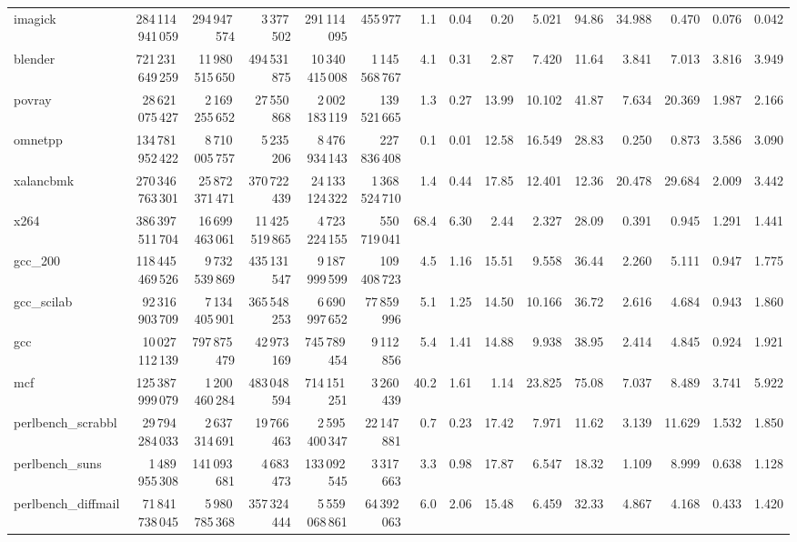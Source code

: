 \documentclass[9pt,landscape,a4paper]{article}
\begin{document}
\begin{adjustbox}{max width=\textwidth, max totalheight=0.50\textheight}
\begin{tabular}{lrrrrrrrrrrrrrr}
imagick & 284\,114\,941\,059 & 294\,947\,574 & 3\,377\,502 & 291\,114\,095 & 455\,977 & 1.1 & 0.04 & 0.20 & 5.021 & 94.86 & 34.988 & 0.470 & 0.076 & 0.042 \\
blender & 721\,231\,649\,259 & 11\,980\,515\,650 & 494\,531\,875 & 10\,340\,415\,008 & 1\,145\,568\,767 & 4.1 & 0.31 & 2.87 & 7.420 & 11.64 & 3.841 & 7.013 & 3.816 & 3.949 \\
povray & 28\,621\,075\,427 & 2\,169\,255\,652 & 27\,550\,868 & 2\,002\,183\,119 & 139\,521\,665 & 1.3 & 0.27 & 13.99 & 10.102 & 41.87 & 7.634 & 20.369 & 1.987 & 2.166 \\
omnetpp & 134\,781\,952\,422 & 8\,710\,005\,757 & 5\,235\,206 & 8\,476\,934\,143 & 227\,836\,408 & 0.1 & 0.01 & 12.58 & 16.549 & 28.83 & 0.250 & 0.873 & 3.586 & 3.090 \\
xalancbmk & 270\,346\,763\,301 & 25\,872\,371\,471 & 370\,722\,439 & 24\,133\,124\,322 & 1\,368\,524\,710 & 1.4 & 0.44 & 17.85 & 12.401 & 12.36 & 20.478 & 29.684 & 2.009 & 3.442 \\
x264 & 386\,397\,511\,704 & 16\,699\,463\,061 & 11\,425\,519\,865 & 4\,723\,224\,155 & 550\,719\,041 & 68.4 & 6.30 & 2.44 & 2.327 & 28.09 & 0.391 & 0.945 & 1.291 & 1.441 \\
gcc\_200 & 118\,445\,469\,526 & 9\,732\,539\,869 & 435\,131\,547 & 9\,187\,999\,599 & 109\,408\,723 & 4.5 & 1.16 & 15.51 & 9.558 & 36.44 & 2.260 & 5.111 & 0.947 & 1.775 \\
gcc\_scilab & 92\,316\,903\,709 & 7\,134\,405\,901 & 365\,548\,253 & 6\,690\,997\,652 & 77\,859\,996 & 5.1 & 1.25 & 14.50 & 10.166 & 36.72 & 2.616 & 4.684 & 0.943 & 1.860 \\
gcc & 10\,027\,112\,139 & 797\,875\,479 & 42\,973\,169 & 745\,789\,454 & 9\,112\,856 & 5.4 & 1.41 & 14.88 & 9.938 & 38.95 & 2.414 & 4.845 & 0.924 & 1.921 \\
mcf & 125\,387\,999\,079 & 1\,200\,460\,284 & 483\,048\,594 & 714\,151\,251 & 3\,260\,439 & 40.2 & 1.61 & 1.14 & 23.825 & 75.08 & 7.037 & 8.489 & 3.741 & 5.922 \\
perlbench\_scrabbl & 29\,794\,284\,033 & 2\,637\,314\,691 & 19\,766\,463 & 2\,595\,400\,347 & 22\,147\,881 & 0.7 & 0.23 & 17.42 & 7.971 & 11.62 & 3.139 & 11.629 & 1.532 & 1.850 \\
perlbench\_suns & 1\,489\,955\,308 & 141\,093\,681 & 4\,683\,473 & 133\,092\,545 & 3\,317\,663 & 3.3 & 0.98 & 17.87 & 6.547 & 18.32 & 1.109 & 8.999 & 0.638 & 1.128 \\
perlbench\_diffmail & 71\,841\,738\,045 & 5\,980\,785\,368 & 357\,324\,444 & 5\,559\,068\,861 & 64\,392\,063 & 6.0 & 2.06 & 15.48 & 6.459 & 32.33 & 4.867 & 4.168 & 0.433 & 1.420 \\

\end{tabular}
\end{adjustbox}
\end{document}

